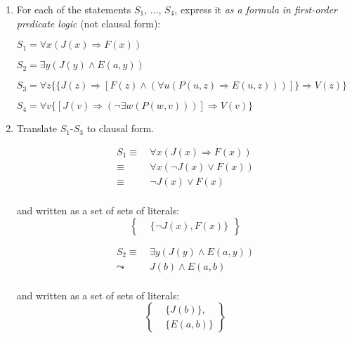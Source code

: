 \documentclass[11pt]{article}
\newcommand{\impl}{\mathbin{\Rightarrow}}
\begin{document}
\begin{enumerate}[label=\alph*.]
    \item For each of the statements $S_1$, ..., $S_4$, express it \textit{as a formula in first-order predicate logic} (not clausal form):
    
    $S_1 = \forall x (J(x) \impl F(x))$
    
    $S_2 = \exists y (J(y) \land E(a, y))$
    
    $S_3 = \forall z \{\{J(z) \impl [F(z) \land (\forall u (P(u, z) \impl E(u, z)))] \} \impl V(z) \}$
    
    $S_4 = \forall v \{ [J(v) \impl (\neg \exists w (P(w, v)))] \impl V(v) \}$
    
    \item Translate $S_1$-$S_3$ to clausal form.
    
    \begin{align*}
        S_1 \equiv\  & \forall x (J(x) \impl F(x)) \\
        \equiv\  & \forall x (\neg J(x) \lor F(x)) \tag{by replacing occurrence of $\Rightarrow$} \\
        \equiv\  & \neg J(x) \lor F(x) \tag{by dropping universal quantifiers} \\
    \end{align*}
    
    and written as a set of sets of literals: 
    $$\left\{
        \begin{aligned}  
            &\{\neg J(x), F(x) \}
        \end{aligned}
    \right\} $$
    
    \begin{align*}
        S_2 \equiv\  & \exists y (J(y) \land E(a, y)) \\
        \leadsto\  & J(b) \land E(a, b) \tag{by skolemization} \\
    \end{align*}
    
    and written as a set of sets of literals: 
    $$\left\{
        \begin{aligned}  
            &\{J(b)\}, \\
            &\{E(a, b) \}
        \end{aligned}
    \right\} $$
    

\end{enumerate}
\end{document}
